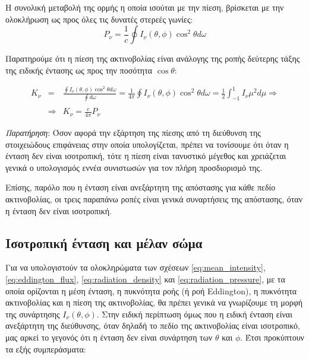 Η συνολική μεταβολή της ορμής η οποία ισούται με την πίεση, βρίσκεται με την ολοκλήρωση ως προς όλες τις δυνατές στερεές γωνίες:
\begin{equation}
    \label{eq:radiation_pressure}
    P_{\nu} = \frac{1}{c} \oint I_{\nu}(\theta, \phi) \cos^2 \theta d\omega
\end{equation}

Παρατηρούμε ότι η πίεση της ακτινοβολίας είναι ανάλογης της ροπής δεύτερης τάξης της ειδικής έντασης ως προς την ποσότητα $\cos \theta$:

\begin{eqnarray*}
    K_{\nu} &=& \frac{\oint I_{\nu}(\theta, \phi) \cos^2 \theta d\omega}{\oint d\omega} = \frac{1}{4\pi} \oint I_{\nu}(\theta, \phi) \cos^2 \theta d\omega = \frac{1}{2} \int_{-1}^{1} I_{\nu} \mu^2 d\mu  \Rightarrow \\ \\
    &\Rightarrow & K_{\nu} = \frac{c}{4\pi} P_{\nu}
\end{eqnarray*}

\textit{Παρατήρηση}: Όσον αφορά την εξάρτηση της πίεσης από τη διεύθυνση της στοιχειώδους επιφάνειας στην οποία υπολογίζεται, πρέπει να τονίσουμε ότι όταν η ένταση δεν είναι ισοτροπική, τότε η πίεση είναι τανυστικό μέγεθος και χρειάζεται γενικά ο υπολογισμός εννέα συνιστωσών για τον πλήρη προσδιορισμό της. 

Επίσης, παρόλο που η ένταση είναι ανεξάρτητη της απόστασης για κάθε πεδίο ακτινοβολίας, οι τρεις παραπάνω ροπές είναι γενικά συναρτήσεις της απόστασης, όταν η ένταση δεν είναι ισοτροπική.


\subsection{Ισοτροπική ένταση και μέλαν σώμα}
Για να υπολογιστούν τα ολοκληρώματα των σχέσεων \eqref{eq:mean_intensity}, \eqref{eq:eddington_flux}, \eqref{eq:radiation_density} και \eqref{eq:radiation_pressure}, με τα οποία ορίζονται η μέση ένταση, η πυκνότητα ροής (ή ροή Eddington), η πυκνότητα ακτινοβολίας και η πίεση της ακτινοβολίας, θα πρέπει γενικά να γνωρίζουμε τη μορφή της συνάρτησης $I_{\nu}(\theta, \phi)$. Στην ειδική περίπτωση όμως που η ειδική ένταση είναι ανεξάρτητη της διεύθυνσης, όταν δηλαδή το πεδίο της ακτινοβολίας είναι ισοτροπικό, μας αρκεί το γεγονός ότι η ένταση δεν είναι συνάρτηση των $\theta$ και $\phi$. Έτσι προκύπτουν τα εξής συμπεράσματα:

